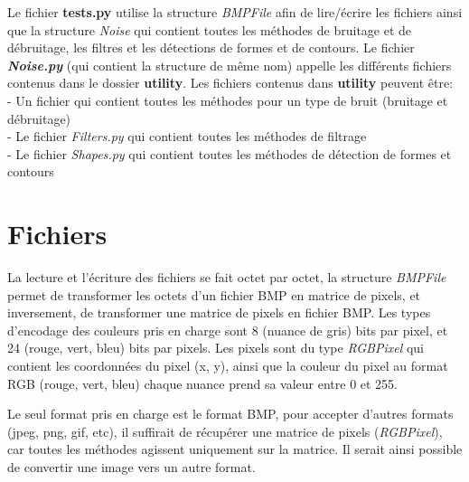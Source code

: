 \documentclass{article}
\begin{document}
		Le fichier \textbf{tests.py} utilise la structure \emph{BMPFile} afin de lire/écrire les fichiers ainsi que la structure \emph{Noise} qui contient toutes les méthodes de bruitage et de débruitage, les filtres et les détections de formes et de contours. Le fichier \emph{\textbf{Noise.py}} (qui contient la structure de même nom) appelle les différents fichiers contenus dans le dossier \textbf{utility}. Les fichiers contenus dans \textbf{utility} peuvent être:\\
		- Un fichier qui contient toutes les méthodes pour un type de bruit (bruitage et débruitage)\\
		- Le fichier \emph{Filters.py} qui contient toutes les méthodes de filtrage\\
		- Le fichier \emph{Shapes.py} qui contient toutes les méthodes de détection de formes et contours



	\section{Fichiers}
		La lecture et l'écriture des fichiers se fait octet par octet, la structure \emph{BMPFile} permet de transformer les octets d'un fichier BMP en matrice de pixels, et inversement, de transformer une matrice de pixels en fichier BMP. Les types d'encodage des couleurs pris en charge sont 8 (nuance de gris) bits par pixel, et 24 (rouge, vert, bleu) bits par pixels. Les pixels sont du type \emph{RGBPixel} qui contient les coordonnées du pixel (x, y), ainsi que la couleur du pixel au format RGB (rouge, vert, bleu) chaque nuance prend sa valeur entre 0 et 255.
		\\\par Le seul format pris en charge est le format BMP, pour accepter d'autres formats (jpeg, png, gif, etc), il suffirait de récupérer une matrice de pixels (\emph{RGBPixel}), car toutes les méthodes agissent uniquement sur la matrice. Il serait ainsi possible de convertir une image vers un autre format.




\end{document}
